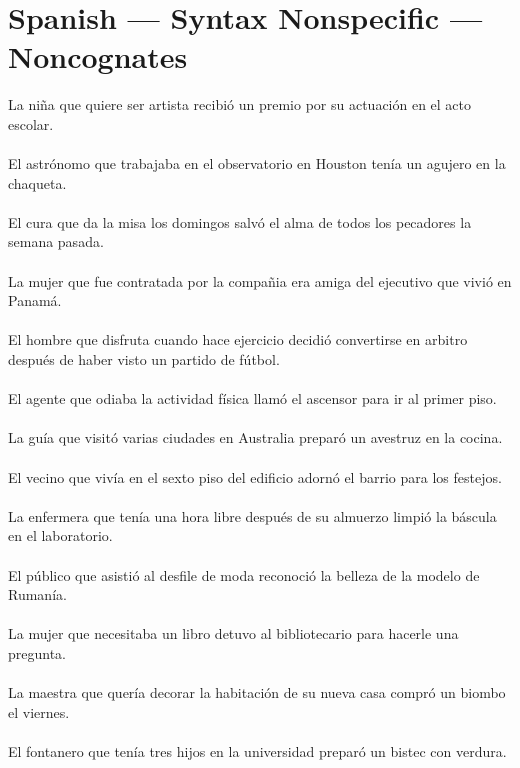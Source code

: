 \section{Spanish --- Syntax Nonspecific --- Noncognates}
La ni\~{n}a que quiere ser artista recibi\'{o} un premio por su actuaci\'{o}n en el acto escolar.	\\	\\
El astr\'{o}nomo que trabajaba en el observatorio en Houston ten\'{i}a un agujero en la chaqueta.	\\	\\
El cura que da la misa los domingos salv\'{o} el alma de todos los pecadores la semana pasada.	\\	\\
La mujer que fue contratada por la compa\~{n}ia era amiga del ejecutivo que vivi\'{o} en Panam\'{a}.	\\	\\
El hombre que disfruta cuando hace ejercicio decidi\'{o} convertirse en arbitro después de haber visto un partido de f\'{u}tbol.	\\	\\
El agente que odiaba la actividad f\'{i}sica llam\'{o} el ascensor para ir al primer piso.	\\	\\
La gu\'{i}a que visit\'{o} varias ciudades en Australia prepar\'{o} un avestruz en la cocina.	\\	\\
El vecino que viv\'{i}a en el sexto piso del edificio adorn\'{o} el barrio para los festejos.	\\	\\
La enfermera que ten\'{i}a una hora libre después de su almuerzo limpi\'{o} la b\'{a}scula en el laboratorio.	\\	\\
El p\'{u}blico que asisti\'{o} al desfile de moda reconoci\'{o} la belleza de la modelo de Ruman\'{i}a.	\\	\\
La mujer que necesitaba un libro detuvo al bibliotecario para hacerle una pregunta.	\\	\\
La maestra que quer\'{i}a decorar la habitaci\'{o}n de su nueva casa compr\'{o} un biombo el viernes.	\\	\\
El fontanero que ten\'{i}a tres hijos en la universidad prepar\'{o} un bistec con verdura.	\\	\\
